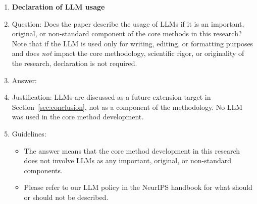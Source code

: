 \begin{enumerate}
\item {\bf Declaration of LLM usage}
    \item[] Question: Does the paper describe the usage of LLMs if it is an important, original, or non-standard component of the core methods in this research? Note that if the LLM is used only for writing, editing, or formatting purposes and does \emph{not} impact the core methodology, scientific rigor, or originality of the research, declaration is not required.
    \item[] Answer: \answerNA{}
    \item[] Justification: LLMs are discussed as a future extension target in Section~\ref{sec:conclusion}, not as a component of the methodology. No LLM was used in the core method development.
    \item[] Guidelines:
    \begin{itemize}
        \item The answer \answerNA{} means that the core method development in this research does not involve LLMs as any important, original, or non-standard components.
        \item Please refer to our LLM policy in the NeurIPS handbook for what should or should not be described.
    \end{itemize}

\end{enumerate}
